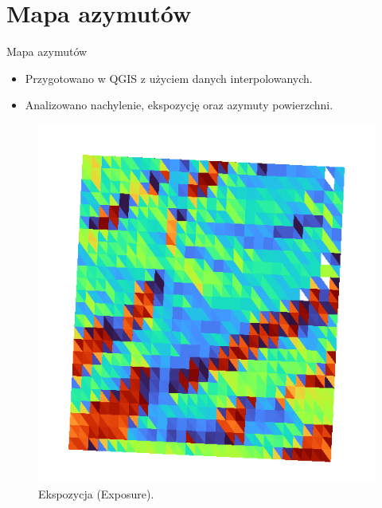 \documentclass{beamer}
\begin{document}
\section{Mapa azymutów}
\begin{frame}{Mapa azymutów}
    \begin{itemize}
        \item Przygotowano w QGIS z użyciem danych interpolowanych.
        \item Analizowano nachylenie, ekspozycję oraz azymuty powierzchni.
    \end{itemize}
    \begin{figure}
        \centering
        \begin{minipage}{0.3\textwidth}
            \centering
            \includegraphics[width=\textwidth]{Eks.png}
            \caption{Ekspozycja (Exposure).}
        \end{minipage}
        \hspace{0.2cm} %
        \begin{minipage}{0.3\textwidth}
            \centering

\end{minipage}
\end{figure}
\end{frame}
\end{document}
